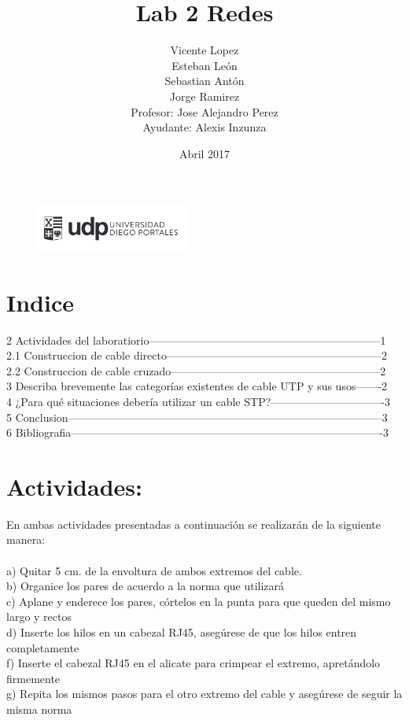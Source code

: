 \documentclass{article}
\title{Lab 2 Redes}
\author{Vicente Lopez\\Esteban León\\Sebastian Antón\\Jorge Ramirez\\Profesor: Jose Alejandro Perez\\Ayudante: Alexis Inzunza}
\date{Abril 2017}
\begin{document}
\begin{figure}[h]
\includegraphics[width=0.45\textwidth]{logo_udp.png}
\maketitle
\end{figure}

\section{Indice}
2 Actividades del laboratiorio---------------------------------------------------------------1\\
2.1 Construccion de cable directo-----------------------------------------------------------2\\
2.2 Construccion de cable cruzado---------------------------------------------------------2\\
3 Describa brevemente las categorías existentes de cable UTP y sus usos-------2\\
4 ¿Para qué situaciones debería utilizar un cable STP?-------------------------------3\\
5 Conclusion--------------------------------------------------------------------------------------3\\
6 Bibliografia-------------------------------------------------------------------------------------3\\
\section{Actividades:}
En ambas actividades presentadas a continuación se realizarán de la siguiente manera:\\\\
a) Quitar 5 cm. de la envoltura de ambos extremos del cable.\\
b) Organice los pares de acuerdo a la norma que utilizará\\
c) Aplane y enderece los pares, córtelos en la punta para que queden del mismo largo y rectos\\
d) Inserte los hilos en un cabezal RJ45, asegúrese de que los hilos entren completamente\\
f) Inserte el cabezal RJ45 en el alicate para crimpear el extremo, apretándolo firmemente\\
g) Repita los mismos pasos para el otro extremo del cable y asegúrese de seguir la misma norma\\\\\\
\end{document}
